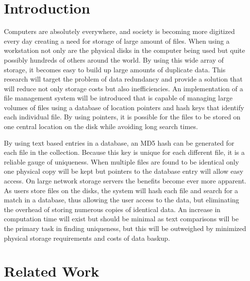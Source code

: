 \documentclass[11pt]{article}
\begin{document}
\maketitle

\vspace*{-.4in}
\section{Introduction}
\label{sec:introduction}
\vspace*{-.1in}

Computers are absolutely everywhere, and society is becoming more digitized every day creating a need for storage of large amount of files. When using a workstation not only are the physical disks in the computer being used but quite possibly hundreds of others around the world. By using this wide array of storage, it becomes easy to build up large amounts of duplicate data. This research will target the problem of data redundancy and provide a solution that will reduce not only storage costs but also inefficiencies. An implementation of a file management system will be introduced that is capable of managing large volumes of files using a database of location pointers and hash keys that identify each individual file. By using pointers, it is possible for the files to be stored on one central location on the disk while avoiding long search times.

By using text based entries in a database, an MD5 hash can be generated for each file in the collection. Because this key is unique for each different file, it is a reliable gauge of uniqueness. When multiple files are found to be identical only one physical copy will be kept but pointers to the database entry will allow easy access. On large network storage servers the benefits become ever more apparent. As users store files on the disks, the system will hash each file and search for a match in a database, thus allowing the user access to the data, but eliminating the overhead of storing numerous copies of identical data. An increase in computation time will exist but should be minimal as text comparisons will be the primary task in finding uniqueness, but this will be outweighed by minimized physical storage requirements and costs of data baskup.

\vspace*{-.1in}
\section{Related Work}
\label{sec:relatedwork}
\vspace*{-.1in}
\end{document}
